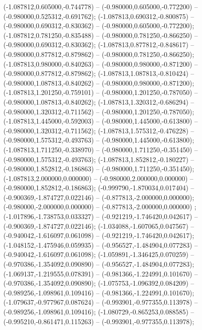  (-1.087812,0.605000,-0.744778) -- (-0.980000,0.605000,-0.772200) -- (-0.980000,0.525312,-0.691762);
 (-1.087813,0.690312,-0.800875) -- (-0.980000,0.690312,-0.830362) -- (-0.980000,0.605000,-0.772200);
 (-1.087812,0.781250,-0.835488) -- (-0.980000,0.781250,-0.866250) -- (-0.980000,0.690312,-0.830362);
 (-1.087813,0.877812,-0.848617) -- (-0.980000,0.877812,-0.879862) -- (-0.980000,0.781250,-0.866250);
 (-1.087813,0.980000,-0.840263) -- (-0.980000,0.980000,-0.871200) -- (-0.980000,0.877812,-0.879862);
 (-1.087813,1.087813,-0.810424) -- (-0.980000,1.087813,-0.840262) -- (-0.980000,0.980000,-0.871200);
 (-1.087813,1.201250,-0.759101) -- (-0.980000,1.201250,-0.787050) -- (-0.980000,1.087813,-0.840262);
 (-1.087813,1.320312,-0.686294) -- (-0.980000,1.320312,-0.711562) -- (-0.980000,1.201250,-0.787050);
 (-1.087813,1.445000,-0.592003) -- (-0.980000,1.445000,-0.613800) -- (-0.980000,1.320312,-0.711562);
 (-1.087813,1.575312,-0.476228) -- (-0.980000,1.575312,-0.493763) -- (-0.980000,1.445000,-0.613800);
 (-1.087813,1.711250,-0.338970) -- (-0.980000,1.711250,-0.351450) -- (-0.980000,1.575312,-0.493763);
 (-1.087813,1.852812,-0.180227) -- (-0.980000,1.852812,-0.186863) -- (-0.980000,1.711250,-0.351450);
 (-1.087813,2.000000,0.000000) -- (-0.980000,2.000000,0.000000) -- (-0.980000,1.852812,-0.186863);
 (-0.999790,-1.870034,0.017404) -- (-0.900369,-1.874727,0.022146) -- (-0.877813,-2.000000,0.000000);
 (-0.980000,-2.000000,0.000000) -- (-0.877813,-2.000000,0.000000) ;
 (-1.017896,-1.738753,0.033327) -- (-0.921219,-1.746420,0.042617) -- (-0.900369,-1.874727,0.022146);
 (-1.034088,-1.607065,0.047567) -- (-0.940042,-1.616097,0.061098) -- (-0.921219,-1.746420,0.042617);
 (-1.048152,-1.475946,0.059935) -- (-0.956527,-1.484904,0.077283) -- (-0.940042,-1.616097,0.061098);
 (-1.059891,-1.346425,0.070259) -- (-0.970386,-1.354092,0.090890) -- (-0.956527,-1.484904,0.077283);
 (-1.069137,-1.219555,0.078391) -- (-0.981366,-1.224991,0.101670) -- (-0.970386,-1.354092,0.090890);
 (-1.075753,-1.096392,0.084209) -- (-0.989256,-1.098961,0.109416) -- (-0.981366,-1.224991,0.101670);
 (-1.079637,-0.977967,0.087624) -- (-0.993901,-0.977355,0.113978) -- (-0.989256,-1.098961,0.109416);
 (-1.080729,-0.865253,0.088585) -- (-0.995210,-0.861471,0.115263) -- (-0.993901,-0.977355,0.113978);
